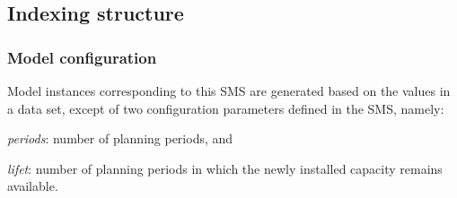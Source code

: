 \documentclass[a4paper,12pt]{article}
\def\vv#1{\ensuremath{\mathbit{\bf #1}}}
\begin{document}
\subsection{Indexing structure}
\begin{comment}
\subsubsection{Intro to indexing structure}
The SMS uses the Structured Modeling (SM) concepts; in particular the
compound entities.
For example, a compound variable $\vv{x}$ actually represents a set of variables
$x_{ij}, i \in I,\; j \in J$, where $i$ and $j$ stand for indices, and $I$ and
$J$ are the sets of values of the corresponding indices.
To illustrate this concept, let $\vv{x}$ be flows between $i$-th warehouse
and $j$-th store.
Then the set $I$ of warehouses can be defined as $I = \{city1, city2, \dots\}$.
Similarly, the set $J$ of shops can be defined as $J = \{loc1, loc2, \dots\}$.

Thus, the indexing structure is composed of:
\btlb
\item symbols of indices (typically a lower-case letter), and
\item symbols of sets (typically, the corresponding upper-case letter).
\etl
The examples of the index-sets below are for illustration only.
The actual members of these sets are defined by the model parameters.
\end{comment}

\subsubsection{Model configuration}\label{sec:cfg}
Model instances corresponding to this SMS are generated based on the values
in a data set, except of two configuration parameters defined in the SMS, namely:
\btlb
\item {\em periods}: number of planning periods, and
\item {\em lifet}: number of planning periods in which the newly installed
	capacity remains available.
\etl
\end{document}
